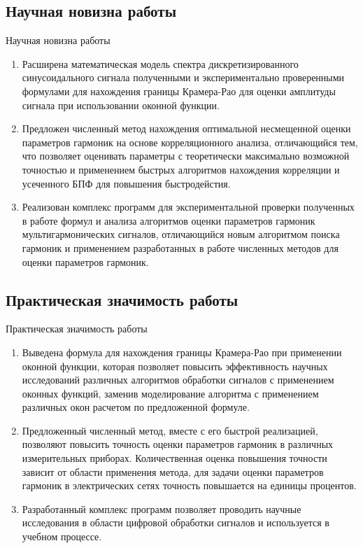 \subsection{Научная новизна работы}
\begin{frame}{Научная новизна работы}
	\begin{enumerate}
\item Расширена математическая модель спектра дискретизированного синусоидального сигнала полученными и экспериментально проверенными формулами для нахождения границы Крамера-Рао для оценки амплитуды сигнала при использовании оконной функции.
\item Предложен численный метод нахождения оптимальной несмещенной оценки параметров гармоник на основе корреляционного анализа, отличающийся тем, что позволяет оценивать параметры с теоретически максимально возможной точностью и применением быстрых алгоритмов нахождения корреляции и усеченного БПФ для повышения быстродейстия.
\item Реализован комплекс программ для экспериментальной проверки полученных в работе формул и анализа алгоритмов оценки параметров гармоник мультигармонических сигналов, отличающийся новым алгоритмом поиска гармоник и применением разработанных в работе численных методов для оценки параметров гармоник.	
\end{enumerate}	
\end{frame}

\subsection{Практическая значимость работы}
\begin{frame}{Практическая значимость работы}
	\begin{enumerate}
\item Выведена формула для нахождения границы Крамера-Рао при применении оконной функции, которая позволяет повысить эффективность научных исследований различных алгоритмов обработки сигналов с применением оконных функций, заменив моделирование алгоритма с применением различных окон расчетом по предложенной формуле.
\item Предложенный численный метод, вместе с его быстрой реализацией, позволяют повысить точность оценки параметров гармоник в различных измерительных приборах. Количественная оценка повышения точности зависит от области применения метода, для задачи оценки параметров гармоник в электрических сетях точность повышается на единицы процентов.
\item Разработанный комплекс программ позволяет проводить научные исследования в области цифровой обработки сигналов и используется в учебном процессе.	\end{enumerate}
\end{frame}

